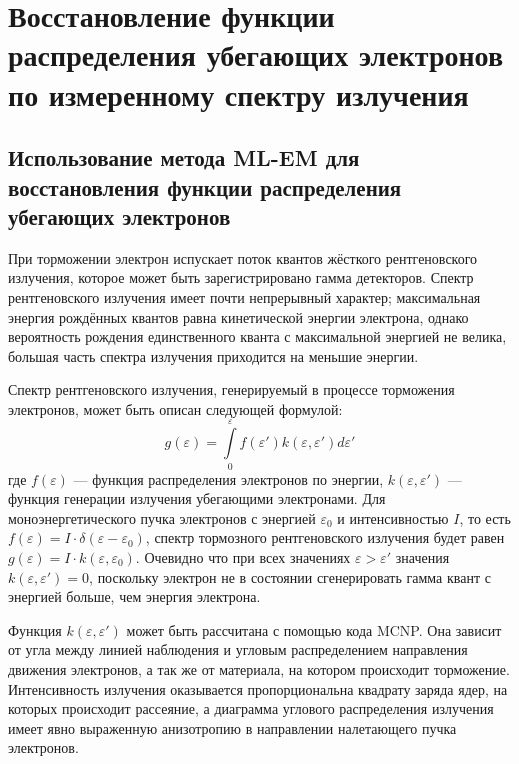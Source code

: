 
\FloatBarrier
\section{ Восстановление функции распределения убегающих электронов по измеренному спектру излучения }

\subsection{ Использование метода ML-EM для восстановления функции распределения убегающих электронов }

При торможении электрон испускает поток квантов жёсткого рентгеновского излучения, которое может быть зарегистрировано гамма детекторов. Спектр рентгеновского излучения имеет почти непрерывный характер; максимальная энергия рождённых квантов равна кинетической энергии электрона, однако вероятность рождения единственного кванта с максимальной энергией не велика, большая часть спектра излучения приходится на меньшие энергии.~\cite{Kuznetsov1974}

Спектр рентгеновского излучения, генерируемый в процессе торможения электронов, может быть описан следующей формулой:
\begin{equation}
  \label{eq:RunawayConvolution}
  g( \varepsilon ) = \int \limits_0^{ \varepsilon } f(\varepsilon') k( \varepsilon, \varepsilon' ) d \varepsilon'
\end{equation}
где $f(\varepsilon)$ --- функция распределения электронов по энергии, $k( \varepsilon, \varepsilon' )$ --- функция генерации излучения убегающими электронами. Для моноэнергетического пучка электронов с энергией $\varepsilon_0$ и интенсивностью $I$, то есть $ f(\varepsilon) = I \cdot \delta( \varepsilon - \varepsilon_0 ) $, спектр тормозного рентгеновского излучения будет равен $g(\varepsilon) = I \cdot k( \varepsilon, \varepsilon_0 )$. Очевидно что при всех значениях $\varepsilon > \varepsilon'$ значения $k( \varepsilon, \varepsilon' ) = 0$, поскольку электрон не в состоянии сгенерировать гамма квант с энергией больше, чем энергия электрона.~\cite{Shevelev2013} 

Функция $k( \varepsilon, \varepsilon' )$ может быть рассчитана с помощью кода MCNP. Она зависит от угла между линией наблюдения и угловым распределением направления движения электронов, а так же от материала, на котором происходит торможение. Интенсивность излучения оказывается пропорциональна квадрату заряда ядер, на которых происходит рассеяние, а диаграмма углового распределения излучения имеет явно выраженную анизотропию в направлении налетающего пучка электронов.~\cite{Shevelev2013}

